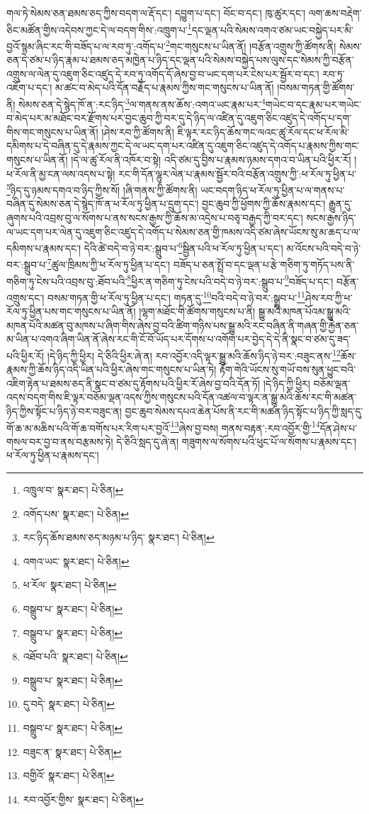 གལ་ཏེ་སེམས་ཅན་ཐམས་ཅད་ཀྱིས་བདག་ལ་རྡོ་དང་། དབྱུག་པ་དང་། བོང་བ་དང་། ཁུ་ཚུར་དང་། ལག་ཆས་བརྡེག་ཅིང་མཚོན་གྱིས་འདེབས་ཀྱང་དེ་ལ་བདག་གིས་:འཁྲུག་པ་\footnote{འཁྲུལ་བ་  སྣར་ཐང་།  པེ་ཅིན། }དང་ལྡན་པའི་སེམས་འགའ་ཙམ་ཡང་བསྐྱེད་པར་མི་བྱའོ་སྙམ་ཞིང་རང་གི་བཟོད་པ་ལ་རབ་ཏུ་:འགོད་པ་\footnote{འགོད་པས་  སྣར་ཐང་།  པེ་ཅིན། }གང་གསུངས་པ་ཡིན་ནོ། །བརྩོན་འགྲུས་ཀྱི་ཚོགས་ནི། སེམས་ཅན་དེ་ཙམ་པ་ཉིད་རྣམ་པ་ཐམས་ཅད་མཁྱེན་པ་ཉིད་དང་ལྡན་པའི་སེམས་བསྐྱེད་པས་ལུས་དང་སེམས་ཀྱི་བརྩོན་འགྲུས་ལ་ལེན་དུ་འཇུག་ཅིང་འཛུད་དེ་རབ་ཏུ་འགོད་དོ་ཞེས་བྱ་བ་ཡང་དག་པར་ངེས་པར་སྦྱོར་བ་དང་། རབ་ཏུ་འཇོག་པ་དང་། མ་ཚང་བ་མེད་པའི་དོན་བརྗོད་པ་རྣམས་ཀྱིས་གང་གསུངས་པ་ཡིན་ནོ། །བསམ་གཏན་གྱི་ཚོགས་ནི། སེམས་ཅན་དེ་སྙེད་ཁོ་ན་:རང་ཉིད་\footnote{རང་ཉིད་ཆོས་ཐམས་ཅད་མཉམ་པ་ཉིད་  སྣར་ཐང་།  པེ་ཅིན། }ལ་གནས་ནས་ཆོས་:འགའ་ཡང་རྣམ་པར་\footnote{འགའ་ཡང་  སྣར་ཐང་།  པེ་ཅིན། }གཡེང་བ་དང་རྣམ་པར་གཡེང་བ་མེད་པར་མ་མཐོང་བར་རྫོགས་པར་བྱང་ཆུབ་ཀྱི་བར་དུ་དེ་ཉིད་ལ་འཛིན་དུ་འཇུག་ཅིང་འཛུད་དེ་འགོད་པ་དག་གིས་གང་གསུངས་པ་ཡིན་ནོ། །ཤེས་རབ་ཀྱི་ཚོགས་ནི། ཇི་ལྟར་རང་ཉིད་ཆོས་གང་ལའང་ཚུ་རོལ་དང་ཕ་རོལ་མི་དམིགས་པ་དེ་བཞིན་དུ་དེ་རྣམས་ཀྱང་དེ་ལ་ཡང་དག་པར་འཛིན་དུ་འཇུག་ཅིང་འཛུད་དེ་འགོད་པ་རྣམས་ཀྱིས་གང་གསུངས་པ་ཡིན་ནོ། །དེ་ལ་ཚུ་རོལ་ནི་འཁོར་བ་སྟེ། འདི་ཙམ་དུ་བྱིས་པ་རྣམས་ཉམས་དགའ་བ་ཡིན་པའི་ཕྱིར་རོ། །ཕ་རོལ་ནི་མྱ་ངན་ལས་འདས་པ་སྟེ། རང་གི་དོན་ལྷུར་ལེན་པ་རྣམས་སྦྱོར་བའི་བརྩོན་འགྲུས་ཀྱི་:ཕ་རོལ་ཏུ་ཕྱིན་པ་\footnote{ཕ་རོལ་  སྣར་ཐང་།  པེ་ཅིན། }ཉིད་དུ་ཉམས་དགའ་བ་ཉིད་ཀྱིས་སོ། །ཞི་གནས་ཀྱི་ཚོགས་ནི། ཡང་བདག་ཉིད་ཕ་རོལ་ཏུ་ཕྱིན་པ་ལ་གནས་པ་བཞིན་དུ་སེམས་ཅན་དེ་སྙེད་ཁོ་ན་ཕ་རོལ་ཏུ་ཕྱིན་པ་དྲུག་དང་། བྱང་ཆུབ་ཀྱི་ཕྱོགས་ཀྱི་ཆོས་རྣམས་དང་། རྒྱུན་དུ་ཞུགས་པའི་འབྲས་བུ་ལ་སོགས་པ་ནས་སངས་རྒྱས་ཀྱི་ཆོས་མ་འདྲེས་པ་བཅྭ་བརྒྱད་ཀྱི་བར་དང་། སངས་རྒྱས་ཉིད་ལ་ཡང་དག་པར་ལེན་དུ་འཇུག་ཅིང་འཛུད་དེ་འགོད་པ་སེམས་ཅན་གྱི་ཁམས་འདི་ཙམ་ཞེས་ཡོངས་སུ་མ་ཆད་པ་ལ་དམིགས་པ་རྣམས་དང་། དེའི་ཚེ་བདེ་བ་ཉེ་བར་:སྒྲུབ་པ་\footnote{བསྒྲུབ་པ་  སྣར་ཐང་།  པེ་ཅིན། }སྦྱིན་པའི་ཕ་རོལ་ཏུ་ཕྱིན་པ་དང་། མ་འོངས་པའི་བདེ་བ་ཉེ་བར་:སྒྲུབ་པ་\footnote{བསྒྲུབ་པ་  སྣར་ཐང་།  པེ་ཅིན། }ཚུལ་ཁྲིམས་ཀྱི་ཕ་རོལ་ཏུ་ཕྱིན་པ་དང་། བཟོད་པ་ཅན་སྤྲོ་བ་དང་ལྡན་པ་རྩེ་གཅིག་ཏུ་གཏོད་པས་ནི་གཅིག་ཏུ་ངེས་པའི་འབྲས་བུ་:ཐོབ་པའི་\footnote{འཐོབ་པའི་  སྣར་ཐང་།  པེ་ཅིན། }ཕྱིར་ན་གཅིག་ཏུ་ངེས་པའི་བདེ་བ་ཉེ་བར་:སྒྲུབ་པ་\footnote{བསྒྲུབ་པ་  སྣར་ཐང་།  པེ་ཅིན། }བཟོད་པ་དང་། བརྩོན་འགྲུས་དང་། བསམ་གཏན་གྱི་ཕ་རོལ་ཏུ་ཕྱིན་པ་དང་། གཏན་དུ་\footnote{དུ་བདེ་  སྣར་ཐང་།  པེ་ཅིན། }བའི་བདེ་བ་ཉེ་བར་:སྒྲུབ་པ་\footnote{བསྒྲུབ་པ་  སྣར་ཐང་།  པེ་ཅིན། }ཤེས་རབ་ཀྱི་ཕ་རོལ་ཏུ་ཕྱིན་པས་གང་གསུངས་པ་ཡིན་ནོ། །ལྷག་མཐོང་གི་ཚོགས་གསུངས་པ་ནི། སྒྱུ་མའི་མཁན་པོའམ་སྒྱུ་མའི་མཁན་པོའི་མཚན་བུ་མཁས་པ་ཞིག་གིས་ཞེས་བྱ་བའི་ཚིག་གཉིས་པས་སྒྱུ་མའི་རང་བཞིན་ནི་གཞན་གྱི་རྐྱེན་ཅན་མ་ཡིན་པ་འགའ་ཞིག་ཡིན་ནོ་ཞེས་རང་གི་ངོ་བོ་ཡོད་པར་དོགས་པ་འགོག་པར་བྱེད་དེ་དེ་ནི་སྣང་བ་ཙམ་དུ་ཟད་པའི་ཕྱིར་རོ། །དེ་ཉིད་ཀྱི་ཕྱིར། དེ་ཅིའི་ཕྱིར་ཞེ་ན། རབ་འབྱོར་འདི་ལྟར་སྒྱུ་མའི་ཆོས་ཉིད་ཉེ་བར་:བཟུང་ནས་\footnote{བཟུང་ན་  སྣར་ཐང་།  པེ་ཅིན། }ཆོས་རྣམས་ཀྱི་ཆོས་ཉིད་འདི་ཡིན་པའི་ཕྱིར་ཞེས་གང་གསུངས་པ་ཡིན་ཏེ། རྟོག་གེའི་ཡོངས་སུ་གཡོ་བས་སུན་ཕྱུང་བའི་འཇིག་རྟེན་པ་ཐམས་ཅད་ནི་སྣང་བ་ཙམ་དུ་རྟོགས་པའི་ཕྱིར་རོ་ཞེས་བྱ་བའི་དོན་ཏོ། །དེ་ཉིད་ཀྱི་ཕྱིར། བཅོམ་ལྡན་འདས་བདག་གིས་ཇི་ལྟར་བཅོམ་ལྡན་འདས་ཀྱིས་གསུངས་པའི་དོན་འཚལ་བ་ལྟར་ན་སྒྱུ་མའི་ཆོས་རང་གི་མཚན་ཉིད་ཀྱིས་སྟོང་པ་ཉིད་ཉེ་བར་བཟུང་ན། བྱང་ཆུབ་སེམས་དཔའ་ཆེན་པོས་ནི་རང་གི་མཚན་ཉིད་སྟོང་པ་ཉིད་ཀྱི་སླད་དུ་གོ་ཆ་མ་མཆིས་པའི་གོ་ཆ་བགོས་པར་རིག་པར་བྱའོ་\footnote{བགྱིའོ་  སྣར་ཐང་།  པེ་ཅིན། }ཞེས་བྱ་བས། གནས་བརྟན་:རབ་འབྱོར་གྱི་\footnote{རབ་འབྱོར་གྱིས་  སྣར་ཐང་།  པེ་ཅིན། }དོན་ཤེས་པ་གསལ་བར་བྱ་བ་ནས་བརྩམས་ཏེ། དེ་ཅིའི་སླད་དུ་ཞེ་ན། གཟུགས་ལ་སོགས་པའི་ཕུང་པོ་ལ་སོགས་པ་རྣམས་དང་། ཕ་རོལ་ཏུ་ཕྱིན་པ་རྣམས་དང་། 